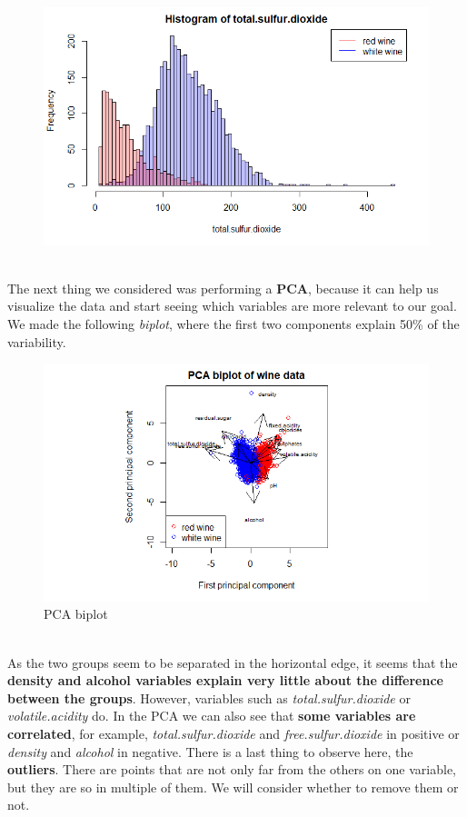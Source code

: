 \documentclass[10pt]{article}
\begin{document}
\begin{figure}[H]
\includegraphics[scale=0.4]{histogram_of_totalsulfurdioxide}
\end{figure}
\ \\
The next thing we considered was performing a \textbf{PCA}, because it can help us visualize the data and start seeing which variables are more relevant to our goal. We made the following \textit{biplot}, where the first two components explain 50\% of the variability. \\
\begin{figure}[H]
\centering
\caption{PCA biplot}
\includegraphics[scale=0.75]{PCA_biplot}
\end{figure}
\ \\
As the two groups seem to be separated in the horizontal edge, it seems that the \textbf{density and alcohol variables explain very little about the difference between the groups}. However, variables such as \textit{total.sulfur.dioxide} or \textit{volatile.acidity} do. In the PCA we can also see that \textbf{some variables are correlated}, for example, \textit{total.sulfur.dioxide} and \textit{free.sulfur.dioxide} in positive or \textit{density} and \textit{alcohol} in negative. There is a last thing to observe here, the \textbf{outliers}. There are points that are not only far from the others on one variable, but they are so in multiple of them. We will consider whether to remove them or not.   \\ \ \\
\end{document}
